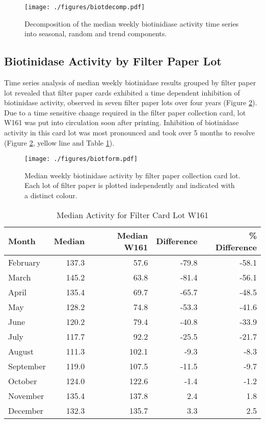 \documentclass[review]{elsarticle}
\begin{document}
\begin{figure}[htbp]
\centering
\texttt{[image: ./figures/biotdecomp.pdf]}
\caption{\label{fig:org4e60cc3}Decomposition of the median weekly biotinidiase activity time series into seasonal, random and trend components.}
\end{figure}

\clearpage

\subsection*{Biotinidase Activity by Filter Paper Lot}
\label{sec:org06d3517}
Time series analysis of median weekly biotinidase results grouped by
filter paper lot revealed that filter paper cards exhibited a time
dependent inhibition of biotinidase activity, observed in seven filter
paper lots over four years (Figure \ref{fig:orge72fada}). Due to a time sensitive
change required in the filter paper collection card, lot W161 was put into
circulation soon after printing. Inhibition of biotinidase activity in
this card lot was most pronounced and took over 5 months to resolve
(Figure \ref{fig:orge72fada}, yellow line and Table \ref{tab:w161_months}).

\begin{figure}[htbp]
\centering
\texttt{[image: ./figures/biotform.pdf]}
\caption{\label{fig:orge72fada}Median weekly biotinidase activity by filter paper collection card lot. Each lot of filter paper is plotted independently and indicated with a distinct colour.}
\end{figure}

\clearpage

\begin{table}[ht]
\centering
\begin{tabular}{lrrrr}
  \hline
Month & Median & Median W161 & Difference & \% Difference \\ 
  \hline
February & 137.3 & 57.6 & -79.8 & -58.1 \\ 
  March & 145.2 & 63.8 & -81.4 & -56.1 \\ 
  April & 135.4 & 69.7 & -65.7 & -48.5 \\ 
  May & 128.2 & 74.8 & -53.3 & -41.6 \\ 
  June & 120.2 & 79.4 & -40.8 & -33.9 \\ 
  July & 117.7 & 92.2 & -25.5 & -21.7 \\ 
  August & 111.3 & 102.1 & -9.3 & -8.3 \\ 
  September & 119.0 & 107.5 & -11.5 & -9.7 \\ 
  October & 124.0 & 122.6 & -1.4 & -1.2 \\ 
  November & 135.4 & 137.8 & 2.4 & 1.8 \\ 
  December & 132.3 & 135.7 & 3.3 & 2.5 \\ 
   \hline
\end{tabular}
\caption{Median Activity for Filter Card Lot W161} 
\label{tab:w161_months}
\end{table}
\end{document}
